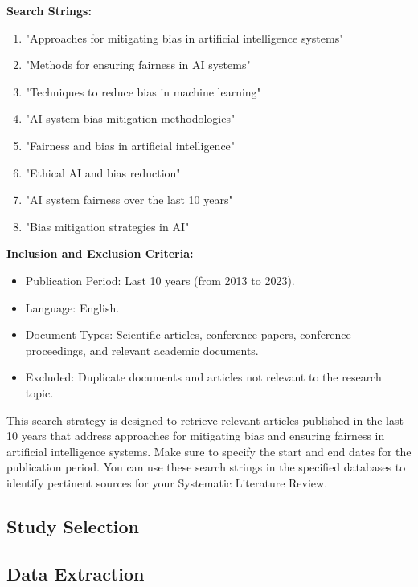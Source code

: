 \documentclass{article}
\begin{document}
\textbf{Search Strings:}
\begin{enumerate}
    \item "Approaches for mitigating bias in artificial intelligence systems"
    \item "Methods for ensuring fairness in AI systems"
    \item "Techniques to reduce bias in machine learning"
    \item "AI system bias mitigation methodologies"
    \item "Fairness and bias in artificial intelligence"
    \item "Ethical AI and bias reduction"
    \item "AI system fairness over the last 10 years"
    \item "Bias mitigation strategies in AI"
\end{enumerate}

\textbf{Inclusion and Exclusion Criteria:}
\begin{itemize}
    \item Publication Period: Last 10 years (from 2013 to 2023).
    \item Language: English.
    \item Document Types: Scientific articles, conference papers, conference proceedings, and relevant academic documents.
    \item Excluded: Duplicate documents and articles not relevant to the research topic.
\end{itemize}

This search strategy is designed to retrieve relevant articles published in the last 10 years that address approaches for mitigating bias and ensuring fairness in artificial intelligence systems. Make sure to specify the start and end dates for the publication period. You can use these search strings in the specified databases to identify pertinent sources for your Systematic Literature Review.

    \subsection{Study Selection}

    \subsection{Data Extraction}
\end{document}
